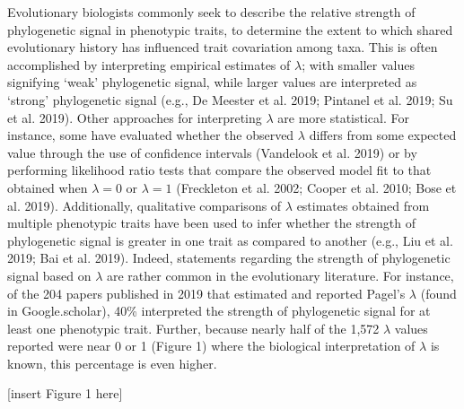 \documentclass[
]{article}
\begin{document}
Evolutionary biologists commonly seek to describe the relative strength
of phylogenetic signal in phenotypic traits, to determine the extent to
which shared evolutionary history has influenced trait covariation among
taxa. This is often accomplished by interpreting empirical estimates of
\(\lambda\); with smaller values signifying `weak' phylogenetic signal,
while larger values are interpreted as `strong' phylogenetic signal
(e.g., De Meester et al. 2019; Pintanel et al. 2019; Su et al. 2019).
Other approaches for interpreting \(\lambda\) are more statistical. For
instance, some have evaluated whether the observed \(\lambda\) differs
from some expected value through the use of confidence intervals
(Vandelook et al. 2019) or by performing likelihood ratio tests that
compare the observed model fit to that obtained when \(\lambda=0\) or
\(\lambda=1\) (Freckleton et al. 2002; Cooper et al. 2010; Bose et al.
2019). Additionally, qualitative comparisons of \(\lambda\) estimates
obtained from multiple phenotypic traits have been used to infer whether
the strength of phylogenetic signal is greater in one trait as compared
to another (e.g., Liu et al. 2019; Bai et al. 2019). Indeed, statements
regarding the strength of phylogenetic signal based on \(\lambda\) are
rather common in the evolutionary literature. For instance, of the 204
papers published in 2019 that estimated and reported Pagel's \(\lambda\)
(found in Google.scholar), 40\% interpreted the strength of phylogenetic
signal for at least one phenotypic trait. Further, because nearly half
of the 1,572 \(\lambda\) values reported were near 0 or 1 (Figure 1)
where the biological interpretation of \(\lambda\) is known, this
percentage is even higher.

\hfill\break

{[}insert Figure 1 here{]} \hfill\break
\end{document}
